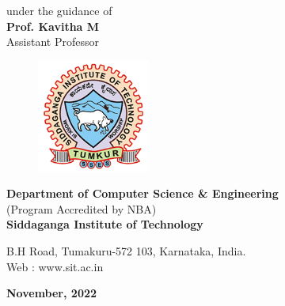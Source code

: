 \begin{titlingpage}
{\normalsize under the guidance of}\\
\Large{\textbf{Prof. Kavitha M}}\\
Assistant Professor\\
\vfill
\begin{figure}[h]
    \centering
    \includegraphics[height=3.7cm]{images/sit.png}
\end{figure}

\textbf{Department of Computer Science \& Engineering}\\
{\normalsize (Program Accredited by NBA)} \\
\textbf{Siddaganga Institute of Technology}\\

\begin{normalsize}
B.H Road, Tumakuru-572 103, Karnataka, India.\\
Web : www.sit.ac.in \\
\end{normalsize}

\textbf{November, 2022}
\end{titlingpage}

